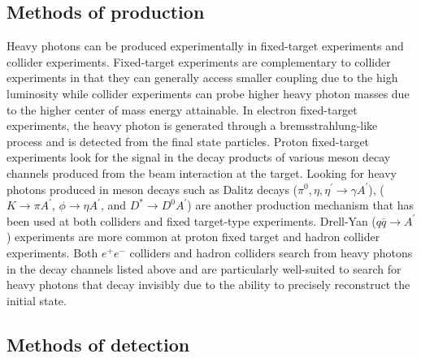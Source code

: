 \subsection{Methods of production}
Heavy photons can be produced experimentally in fixed-target experiments and collider experiments. Fixed-target experiments are complementary to collider experiments in that they can generally access smaller coupling due to the high luminosity while collider experiments can probe higher heavy photon masses due to the higher center of mass energy attainable. In electron fixed-target experiments, the heavy photon is generated through a bremsstrahlung-like process and is detected from the final state particles. Proton fixed-target experiments look for the signal in the decay products of various meson decay channels produced from the beam interaction at the target. Looking for heavy photons produced in meson decays such as Dalitz decays ($\pi^0, \eta, \eta^{\prime}\rightarrow \gamma A^{\prime}$), ($K\rightarrow\pi A^{\prime} $, $\phi\rightarrow\eta A^{\prime}$, and $D^{\ast}\rightarrow D^{0}A^{\prime}$) are another production mechanism that has been used at both colliders and fixed target-type experiments. Drell-Yan ($q\bar{q}\rightarrow A^{\prime}$) experiments are more common at proton fixed target and hadron collider experiments. Both $e^+e^-$ colliders and hadron colliders search from heavy photons in the decay channels listed above and are particularly well-suited to search for heavy photons that decay invisibly due to the ability to precisely reconstruct the initial state. 

\subsection{Methods of detection}

